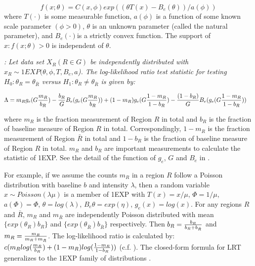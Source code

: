 \documentclass[AMA,LATO1COL]{WileyNJD-v2-bak}
\begin{document}
\begin{equation}
f(x; \theta )=C(x,\phi)exp((\theta T(x)-B_e(\theta))/a(\phi))
\label{oneexp}
\end{equation}
where  $T(\cdot)$ is some measurable function, $a(\phi)$ is a function of some known scale parameter $(\phi>0)$, $\theta$ is an unknown parameter (called the natural parameter), and $B_e(\cdot)$is a strictly convex function. The support of ${x:f(x;\theta)>0}$ is independent of $\theta$.

\begin{theorem}\label{thm1}
{\it\cite{DagMaxmize}:}
{\it Let data set $X_R (R\in G)$ be independently distributed with $x_R\sim 1EXP(\theta,\phi,T,B_e,a$). The log-likelihood ratio test statistic for testing $H_{0}: \theta_R = \theta_{\bar R}$ versus $H_{1}: \theta_R \neq \theta_{\bar R}$ is given by:}

\begin{eqnarray}
\Lambda&={m_R}g_e({G{m_R\over b_R}})-{b_R\over G} {B_e(g_e(G{m_R\over b_R}))} +(1-m_R)g_e({G{1-m_R\over {1-b_R}}})-{(1-b_R)\over G}{B_e(g_e({G{1-m_R\over {1-b_R}}}))}
\label{eq}
\end{eqnarray}
\label{thm1}
\end{theorem}

where $m_R$ is the fraction measurement of Region $R$ in total and $b_R$ is the fraction of baseline measure of Region $R$ in total. Correspondingly, $1-m_R$ is the fraction measurement of Region $\bar R$ in total and $1-b_R$ is the fraction of baseline measure of Region $R$ in total. $m_R$  and $b_R$ are important measurements to calculate the statistic of 1EXP. See the detail of the function of $g_e$, $G$ and $B_e$ in \cite{DagMaxmize}.

For example, if we assume the counts $m_R$ in a region $R$ follow a Poisson distribution with baseline $b$ and intensity $\lambda$, then  a random variable $x \sim Poisson(\lambda \mu)$ is a member of 1EXP with $T(x)=x/\mu$, $\Phi=1/\mu$, $a(\Phi)=\Phi$, $\theta=log(\lambda)$, $B_e{\theta}=exp(\eta)$, $g_e{(x)}=log(x)$. For any regions $R$ and $\bar R$, $m_R$ and $m_{\bar R}$ are independently Poisson distributed with mean $\{exp(\theta_R)b_R\}$ and $\{exp(\theta_{\bar R})b_{\bar R}\}$ respectively. Then $b_R={b_R\over {b_R+b_{\bar R}}}$ and $m_R={m_R\over {m_R+m_{\bar R}}}$. The log-likelihood ratio is calculated by: $c(m_R log ({m_R\over {b_R}})+ (1-m_R)log({{1-m_R}\over {1-b_R} }))$ (c.f. \cite{DagMaxmize}). The closed-form formula for LRT generalizes to the 1EXP family of distributions \cite{DagMaxmize}.
\end{document}
